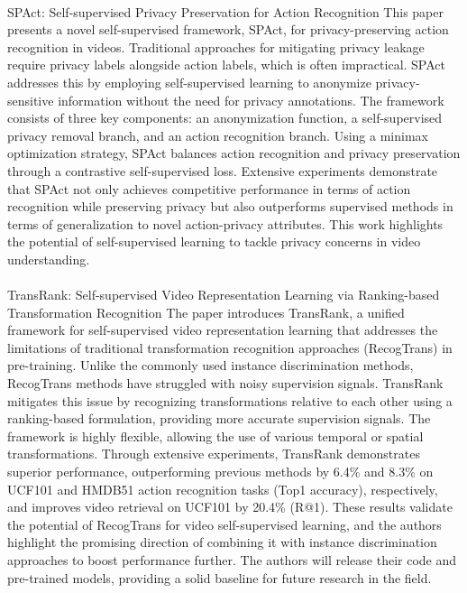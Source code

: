 \documentclass[11pt,a4paper]{report}
\begin{document}
\paragraph{} SPAct: Self-supervised Privacy Preservation for Action Recognition \cite{dave2022spact}
This paper presents a novel self-supervised framework, SPAct, for privacy-preserving action recognition in videos. Traditional approaches for mitigating privacy leakage require privacy labels alongside action labels, which is often impractical. SPAct addresses this by employing self-supervised learning to anonymize privacy-sensitive information without the need for privacy annotations. The framework consists of three key components: an anonymization function, a self-supervised privacy removal branch, and an action recognition branch. Using a minimax optimization strategy, SPAct balances action recognition and privacy preservation through a contrastive self-supervised loss. Extensive experiments demonstrate that SPAct not only achieves competitive performance in terms of action recognition while preserving privacy but also outperforms supervised methods in terms of generalization to novel action-privacy attributes. This work highlights the potential of self-supervised learning to tackle privacy concerns in video understanding.

\paragraph{} TransRank: Self-supervised Video Representation Learning via Ranking-based Transformation Recognition \cite{duan2022transrank}
The paper introduces TransRank, a unified framework for self-supervised video representation learning that addresses the limitations of traditional transformation recognition approaches (RecogTrans) in pre-training. Unlike the commonly used instance discrimination methods, RecogTrans methods have struggled with noisy supervision signals. TransRank mitigates this issue by recognizing transformations relative to each other using a ranking-based formulation, providing more accurate supervision signals. The framework is highly flexible, allowing the use of various temporal or spatial transformations. Through extensive experiments, TransRank demonstrates superior performance, outperforming previous methods by 6.4\% and 8.3\% on UCF101 and HMDB51 action recognition tasks (Top1 accuracy), respectively, and improves video retrieval on UCF101 by 20.4\% (R@1). These results validate the potential of RecogTrans for video self-supervised learning, and the authors highlight the promising direction of combining it with instance discrimination approaches to boost performance further. The authors will release their code and pre-trained models, providing a solid baseline for future research in the field.
\end{document}
